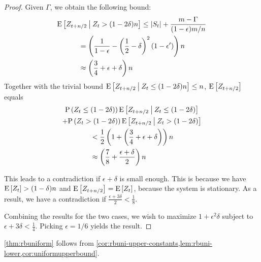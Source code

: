 \begin{proof}
	Given $\Gamma$, we obtain the following bound:
	\begin{multline*}
		\mathrm{E}\left[Z_{t+n/2} \:\middle|\: Z_t > (1-2\delta)n\right] \le |S_t| + \frac{m-\Gamma}{(1-\epsilon)m/n} \\
		\begin{aligned} &= \left(\frac{1}{1-\epsilon} - \left(\frac{1}{2}-\delta\right)^2(1-\epsilon')\right) n \\
		&\approx \left(\frac{3}{4}+\epsilon+\delta\right) n \end{aligned}
	\end{multline*}
	Together with the trivial bound $\mathrm{E}\left[Z_{t+n/2} \:\middle|\: Z_t \le (1-2\delta)n\right]
	\le n$,  $\mathrm{E}\left[Z_{t+n/2}\right]$ equals
	\begin{multline*}
		\mathrm{P}\left(Z_t \le (1-2\delta)\right)\mathrm{E}\left[Z_{t+n/2} \:\middle|\: Z_t \le (1-2\delta)\right] \\
		+ \mathrm{P}\left(Z_t > (1-2\delta)\right)\mathrm{E}\left[Z_{t+n/2} \:\middle|\: Z_t > (1-2\delta)\right] \\
		\begin{aligned} &< \frac{1}{2} \left( 1 + \left(\frac{3}{4}+\epsilon+\delta\right) \right) n\\
		&\approx \left(\frac{7}{8} + \frac{\epsilon+\delta}{2}\right) n \end{aligned}
	\end{multline*}
		
	This leads to a contradiction if $\epsilon+\delta$ is small enough.  This
	is because we have $\mathrm{E}\left[Z_t\right] > (1-\delta)n$ and $\mathrm{E}\left[Z_{t+n/2}\right] = \mathrm{E}\left[Z_t\right]$,
	because the system is stationary.  As a result, we have a contradiction if
	$\frac{\epsilon+3\delta}{2} < \frac{1}{8}$.

	Combining the results for the two cases, we wish to maximize
	$1+\epsilon^2\delta$ subject to $\epsilon+3\delta < \frac{1}{4}.$ Picking
	$\epsilon = 1/6$ yields the result.
\end{proof}

\cref{thm:rbuniform} follows from
\cref{cor:rbuni-upper-constants,lem:rbuni-lower,cor:uniformupperbound}.


